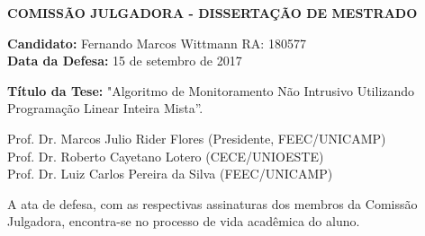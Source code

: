 \newpage

\begin{center}
  \large{\textbf{COMISSÃO JULGADORA - DISSERTAÇÃO DE MESTRADO}}
\end{center}


{\setlength{\parindent}{0cm}

\vspace{2cm}


\textbf{Candidato:} Fernando Marcos Wittmann RA: 180577 \\
\textbf{Data da Defesa:} 15 de setembro de 2017

\vspace{2cm}

\textbf{Título da Tese:} "Algoritmo de Monitoramento Não Intrusivo Utilizando Programação Linear Inteira Mista”.

\vspace{3cm}

Prof. Dr. Marcos Julio Rider Flores (Presidente, FEEC/UNICAMP)\\
Prof. Dr. Roberto Cayetano Lotero (CECE/UNIOESTE)\\
Prof. Dr. Luiz Carlos Pereira da Silva (FEEC/UNICAMP)\\

\vspace{3cm}

 A ata de defesa, com as respectivas assinaturas dos membros da Comissão Julgadora, encontra-se no processo de vida acadêmica do aluno.
 
}